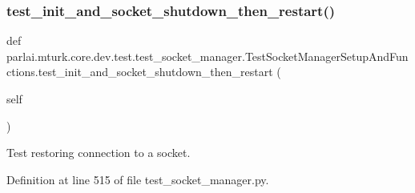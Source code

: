 \subsubsection{\texorpdfstring{test\+\_\+init\+\_\+and\+\_\+socket\+\_\+shutdown\+\_\+then\+\_\+restart()}{test\_init\_and\_socket\_shutdown\_then\_restart()}}
{\footnotesize\ttfamily def parlai.\+mturk.\+core.\+dev.\+test.\+test\+\_\+socket\+\_\+manager.\+Test\+Socket\+Manager\+Setup\+And\+Functions.\+test\+\_\+init\+\_\+and\+\_\+socket\+\_\+shutdown\+\_\+then\+\_\+restart (\begin{DoxyParamCaption}\item[{}]{self }\end{DoxyParamCaption})}

\begin{DoxyVerb}Test restoring connection to a socket.
\end{DoxyVerb}
 

Definition at line 515 of file test\+\_\+socket\+\_\+manager.\+py.


